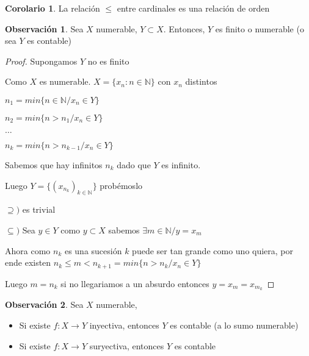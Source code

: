 \documentclass[12pt]{article}
\newcommand{\N}{\mathbb{N}}
\newcommand{\ra}{\rightarrow}
\theoremstyle{definition}
\newtheorem*{remark}{Observación}
\newtheorem{corollary}{Corolario}[theorem]
\begin{document}
\begin{corollary}
La relación $\leq$ entre cardinales es una relación de orden  
\end{corollary}

\begin{remark}
  Sea $X$ numerable, $Y \subset X$. Entonces, $Y$ es finito o numerable (o sea $Y$ es contable)

  \begin{proof}
    Supongamos $Y$ no es finito 

    Como $X$ es numerable. $X = \{x_{n} : n \in \N \}$ con $x_{n}$ distintos

    $n_{1} = min \{n \in \N / x_{n} \in Y \}$ 

    $n_{2} = min \{ n > n_{1} / x_{n} \in Y \}$

    $\dots$

    $ n_{k} = min \{ n > n_{k -1} / x_{n} \in Y \}$

    Sabemos que hay infinitos $n_{k}$ dado que $Y$ es infinito.

    Luego $Y = \{ (x_{n_{k}})_{k \in \N} \}$ probémoslo 
  
  $\supseteq ) $ es trivial

$\subseteq) $ Sea $y \in Y$ como $y \subset X$ sabemos $\exists m \in \N  / y = x_{m}$

Ahora como $n_{k}$ es una sucesión $k$ puede ser tan grande como uno quiera, por ende existen $n_{k} \leq m < n_{k + 1} = min \{n > n_{k} / x_{n} \in Y\}$ 

Luego $m = n_{k}$ si no llegariamos a un absurdo entonces $y = x_{m} = x_{m_{k}}$



  \end{proof}
\end{remark}

\begin{remark}
  Sea $X$ numerable,
  \begin{itemize}
    \item Si existe $f:X \ra Y $ inyectiva, entonces $Y$ es contable (a lo sumo numerable)
	\item Si existe $f:X \ra Y$ suryectiva, entonces $Y$ es contable
    \end{itemize}
\end{remark}
\end{document}
